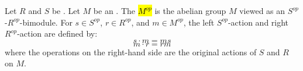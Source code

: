\begin{definition} \label{definition:opposite_module_of_a_general_bimodule_over_rings}
    Let $R$ and $S$ be . Let $M$ be an . 
    The  \hl{$M^{op}$} is the abelian group $M$ viewed as an $S^{op}$-$R^{op}$-bimodule. For $s \in S^{op}$, $r \in R^{op}$, and $m \in M^{op}$, the left $S^{op}$-action and right $R^{op}$-action are defined by:
    $$s \cdot m = ms$$
    $$m \cdot r = rm$$
    where the operations on the right-hand side are the original actions of $S$ and $R$ on $M$.
\end{definition}